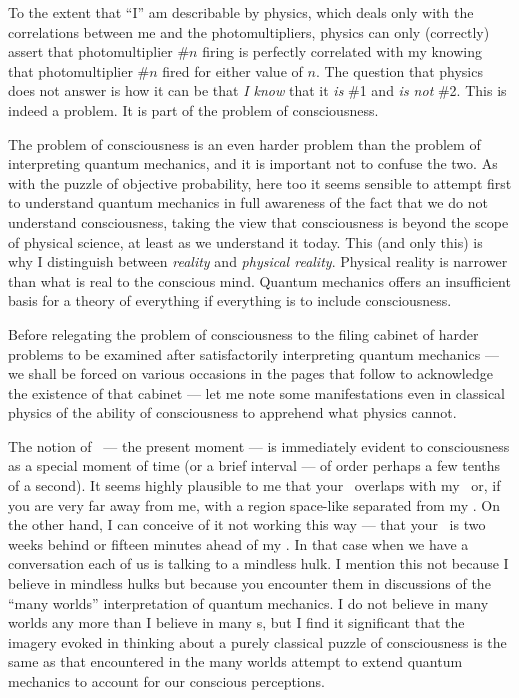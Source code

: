 To the extent that ``I'' am describable by physics, which deals only
with the correlations between me and the photomultipliers, physics
can only (correctly) assert that photomultiplier
\#$n$ firing is perfectly correlated with my knowing that
photomultiplier \#$n$ fired for either value of $n$.  The question
that physics does not answer is how it can be that {\it I know\/}
that it {\it is\/} \#1 and {\it is not\/} \#2.  This is indeed a
problem.  It is part of the problem of  consciousness.  

The problem of consciousness is an even harder problem than the
problem of interpreting quantum mechanics, and it is important not to
confuse the two.  As with the puzzle of objective probability, here
too it seems sensible to attempt first to understand quantum mechanics
in full awareness of the fact that we do not understand consciousness,
taking the view that consciousness is beyond the scope of physical
science, at least as we understand it today.  This (and only this) is
why I distinguish between {\it reality\/} and {\it physical
reality\/}.  Physical reality is narrower than what is real to the
conscious mind.  Quantum mechanics offers an insufficient basis for a
theory of everything if everything is to include consciousness.

Before relegating the problem of consciousness to the filing
cabinet of harder problems to be examined after satisfactorily
interpreting quantum mechanics --- we shall be forced on various
occasions in the pages that follow to acknowledge the existence of that
cabinet --- let me note some manifestations even in classical physics
of the ability of consciousness to apprehend what physics
cannot.  

The notion of \now\ --- the present moment --- is immediately
evident to consciousness as a special moment of time (or a brief
interval --- of order perhaps a few tenths of a second).  It seems
highly plausible to me that your
\now\ overlaps with my
\now\ or, if you are very far away from me, with a region space-like
separated from my
\now.  On the other hand, I can conceive of it not working this way
--- that your \now\ is two weeks behind or fifteen minutes ahead of my
\now.  In that case when we have a conversation each of us is talking
to a mindless hulk.  I mention this not because I believe in mindless
hulks but because you encounter them in discussions of the ``many
worlds'' interpretation of quantum mechanics.  I do not believe in
many worlds any more than I believe in many \now s, but I find it
significant that the imagery evoked in thinking about a purely
classical puzzle of consciousness is the same as that encountered in
the many worlds attempt to extend quantum mechanics to account for our
conscious perceptions.\fn 

